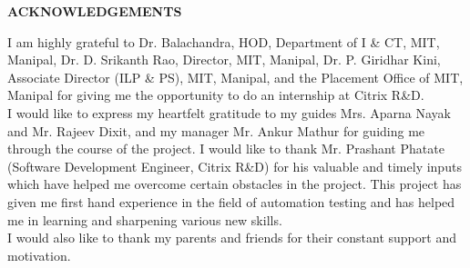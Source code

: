  \begin{center}
\large{\textbf{ACKNOWLEDGEMENTS}}\\
\vspace{1cm}
\end{center}
I am highly grateful to Dr. Balachandra, HOD, Department of I  \& CT, MIT, Manipal, Dr. D. Srikanth Rao, Director, MIT, Manipal, Dr. P. Giridhar Kini, Associate Director (ILP \& PS), MIT, Manipal, and the Placement Office of MIT, Manipal for giving me the opportunity to do an internship at Citrix R\&D.\\

I would like to express my heartfelt gratitude to my guides Mrs. Aparna Nayak and Mr. Rajeev Dixit, and my manager Mr. Ankur Mathur for guiding me through the course of the project.  I would like to thank Mr. Prashant Phatate (Software Development Engineer, Citrix R\&D) for his valuable and timely inputs which have helped me overcome certain obstacles in the project. This project has given me first hand experience in the field of automation testing and has helped me in learning and sharpening various new skills.\\ 

I would also like to thank my parents and friends for their constant support and motivation.
